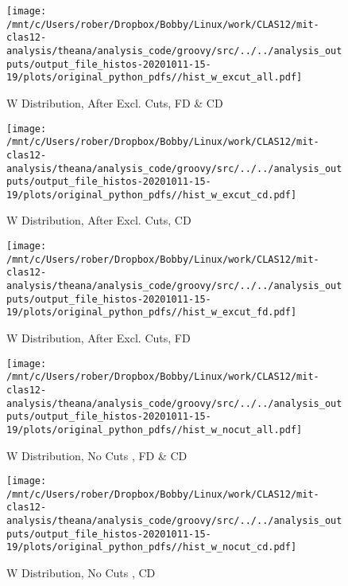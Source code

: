 \documentclass{article}
\begin{document}
\begin{landscape}
\begin{figure}[h]
        \texttt{[image: /mnt/c/Users/rober/Dropbox/Bobby/Linux/work/CLAS12/mit-clas12-analysis/theana/analysis\_code/groovy/src/../../analysis\_outputs/output\_file\_histos-20201011-15-19/plots/original\_python\_pdfs//hist\_w\_excut\_all.pdf]}
        \captionsetup{textformat=empty,labelformat=blank}
        \caption{W Distribution, After Excl. Cuts, FD \& CD}
    \end{figure}
    \clearpage
    
    \begin{figure}[h]
        \centering

        \texttt{[image: /mnt/c/Users/rober/Dropbox/Bobby/Linux/work/CLAS12/mit-clas12-analysis/theana/analysis\_code/groovy/src/../../analysis\_outputs/output\_file\_histos-20201011-15-19/plots/original\_python\_pdfs//hist\_w\_excut\_cd.pdf]}
        \captionsetup{textformat=empty,labelformat=blank}
        \caption{W Distribution, After Excl. Cuts, CD}
    \end{figure}
    \clearpage
    
    \begin{figure}[h]
        \centering

        \texttt{[image: /mnt/c/Users/rober/Dropbox/Bobby/Linux/work/CLAS12/mit-clas12-analysis/theana/analysis\_code/groovy/src/../../analysis\_outputs/output\_file\_histos-20201011-15-19/plots/original\_python\_pdfs//hist\_w\_excut\_fd.pdf]}
        \captionsetup{textformat=empty,labelformat=blank}
        \caption{W Distribution, After Excl. Cuts, FD}
    \end{figure}
    \clearpage
    
    \begin{figure}[h]
        \centering

        \texttt{[image: /mnt/c/Users/rober/Dropbox/Bobby/Linux/work/CLAS12/mit-clas12-analysis/theana/analysis\_code/groovy/src/../../analysis\_outputs/output\_file\_histos-20201011-15-19/plots/original\_python\_pdfs//hist\_w\_nocut\_all.pdf]}
        \captionsetup{textformat=empty,labelformat=blank}
        \caption{W Distribution, No Cuts , FD \& CD}
    \end{figure}
    \clearpage
    
    \begin{figure}[h]
        \centering

        \texttt{[image: /mnt/c/Users/rober/Dropbox/Bobby/Linux/work/CLAS12/mit-clas12-analysis/theana/analysis\_code/groovy/src/../../analysis\_outputs/output\_file\_histos-20201011-15-19/plots/original\_python\_pdfs//hist\_w\_nocut\_cd.pdf]}
        \captionsetup{textformat=empty,labelformat=blank}
        \caption{W Distribution, No Cuts , CD}
    \end{figure}
    \clearpage
    

\end{landscape}
\end{document}
